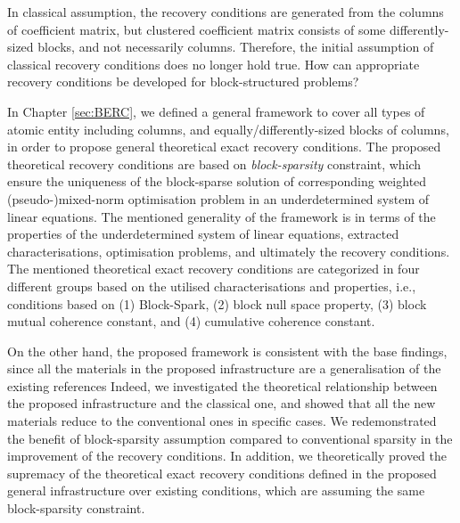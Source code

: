 \begin{tcolorbox}
\begin{challenge}
In classical assumption, the recovery conditions are generated from the columns of coefficient matrix, but clustered coefficient matrix consists of some differently-sized blocks, and not necessarily columns.
Therefore, the initial assumption of classical recovery conditions does no longer hold true. 
How can appropriate recovery conditions be developed for block-structured problems? 
\end{challenge}
\end{tcolorbox}

In Chapter \ref{sec:BERC}, we defined a general framework to cover all types of atomic entity including columns, and equally/differently-sized blocks of columns, in order to propose general theoretical exact recovery conditions.
The proposed theoretical recovery conditions are based on \emph{block-sparsity} constraint, which ensure the uniqueness of the block-sparse solution of corresponding weighted (pseudo-)mixed-norm optimisation problem in an underdetermined system of linear equations.
The mentioned generality of the framework is in terms of the properties of the underdetermined system of linear equations, extracted characterisations, optimisation problems, and ultimately the recovery conditions.
The mentioned theoretical exact recovery conditions are categorized in four different groups based on the utilised characterisations and properties, i.e., conditions based on (1) Block-Spark, (2) block null space property, (3) block mutual coherence constant, and (4) cumulative coherence constant.

On the other hand, the proposed framework is consistent with the base findings, since all the materials in the proposed infrastructure are a generalisation of the existing references 
Indeed, we investigated the theoretical relationship between the proposed infrastructure and the classical one, and showed that all the new materials reduce to the conventional ones in specific cases.
We redemonstrated the benefit of block-sparsity assumption compared to conventional sparsity in the improvement of the recovery conditions.
In addition, we theoretically proved the supremacy of the theoretical exact recovery conditions defined in the proposed general infrastructure over existing conditions, which are assuming the same block-sparsity constraint.

